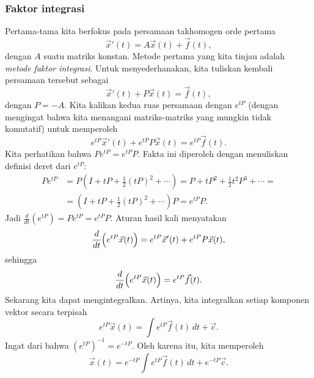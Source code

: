 \subsubsection{Faktor integrasi}

Pertama-tama kita berfokus pada persamaan takhomogen orde pertama
\begin{equation*}
{\vec{x}}'(t) = A\vec{x}(t) + \vec{f}(t) ,
\end{equation*}
dengan $A$ suatu matriks konstan.  Metode pertama yang kita tinjau adalah
\emph{metode faktor integrasi}.
Untuk menyederhanakan, kita tuliskan kembali persamaan tersebut sebagai
\begin{equation*}
{\vec{x}}'(t) + P \vec{x}(t) = \vec{f}(t) ,
\end{equation*}
dengan $P = -A$.
Kita kalikan kedua ruas
persamaan dengan $e^{tP}$ (dengan mengingat bahwa kita menangani matriks-matriks yang
mungkin tidak komutatif) untuk memperoleh
\begin{equation*}
e^{tP}{\vec{x}}'(t) + e^{tP}P\vec{x}(t) = e^{tP}\vec{f}(t) .
\end{equation*}
Kita perhatikan bahwa $P e^{tP} = e^{tP} P$.  Fakta ini diperoleh dengan menuliskan
definisi deret dari $e^{tP}$:
\begin{equation*}
\begin{split}
P e^{tP} & = 
P \left(
I + tP + \frac{1}{2} {(tP)}^2 + \cdots \right)
=
P + tP^2 + \frac{1}{2} t^2P^3 + \cdots
=
\\
& =
\left(
I + tP + \frac{1}{2} {(tP)}^2 + \cdots \right) P 
= e^{tP} P . 
\end{split}
\end{equation*}
Jadi $\frac{d}{dt} \left( e^{tP} \right) = P e^{tP} = e^{tP} P$.  Aturan
hasil kali menyatakan
\begin{equation*}
\frac{d}{dt}
\Bigl( e^{tP} \vec{x}(t) \Bigr) =
e^{tP}{\vec{x}}'(t) + e^{tP}P\vec{x}(t),
\end{equation*}
sehingga
\begin{equation*}
\frac{d}{dt}
\Bigl( e^{tP} \vec{x}(t) \Bigr) = e^{tP}\vec{f}(t) .
\end{equation*}
Sekarang kita dapat mengintegralkan.  Artinya, kita integralkan setiap komponen vektor
secara terpisah
\begin{equation*}
e^{tP} \vec{x}(t) = \int e^{tP}\vec{f}(t) \, dt + \vec{c} .
\end{equation*}
Ingat dari  bahwa ${(e^{tP})}^{-1} = e^{-tP}$.
Oleh karena itu, kita memperoleh
\begin{equation*}
\vec{x}(t) = e^{-tP} \int e^{tP}\vec{f}(t) \, dt + e^{-tP} \vec{c} .
\end{equation*}

